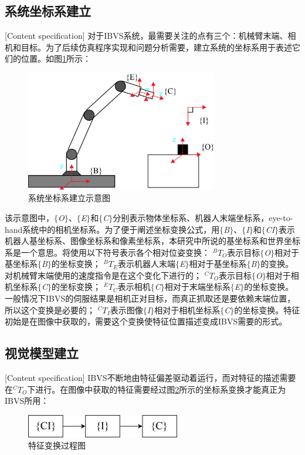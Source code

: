 \documentclass[fontset=fandol,type=bachelor,campus=harbin]{hithesisbook}
\begin{document}
\subsection{系统坐标系建立}[Content specification]
对于IBVS系统，最需要关注的点有三个：机械臂末端、相机和目标。为了后续仿真程序实现和问题分析需要，建立系统的坐标系用于表述它们的位置。如图\ref{系统坐标系建立}所示：
\begin{figure}[h]
\centering
\includegraphics[width = 0.75\textwidth]{chapter2/系统坐标系建立}
\caption{系统坐标系建立示意图}
\label{系统坐标系建立}
\end{figure}

该示意图中，$\lbrace$\textit{O}$\rbrace$、$\lbrace$\textit{E}$\rbrace$和$\lbrace$\textit{C}$\rbrace$分别表示物体坐标系、机器人末端坐标系，eye-to-hand系统中的相机坐标系。为了便于阐述坐标变换公式，用$\lbrace$\textit{B}$\rbrace$、$\lbrace$\textit{I}$\rbrace$和$\lbrace$\textit{CI}$\rbrace$表示机器人基坐标系、图像坐标系和像素坐标系，本研究中所说的基坐标系和世界坐标系是一个意思。将使用以下符号表示各个相对位姿变换：
$^{B}T_O$表示目标$\lbrace$\textit{O}$\rbrace$相对于基坐标系$\lbrace$\textit{B}$\rbrace$的坐标变换；
$^{B}T_E$表示机器人末端$\lbrace$\textit{E}$\rbrace$相对于基坐标系$\lbrace$\textit{B}$\rbrace$的变换。对机械臂末端使用的速度指令是在这个变化下进行的；
$^{C}T_O$表示目标$\lbrace$\textit{O}$\rbrace$相对于相机坐标系$\lbrace$\textit{C}$\rbrace$的坐标变换；
$^{E}T_C$表示相机$\lbrace$\textit{C}$\rbrace$相对于末端坐标系$\lbrace$\textit{E}$\rbrace$的坐标变换。一般情况下IBVS的伺服结果是相机正对目标，而真正抓取还是要依赖末端位置，所以这个变换是必要的；
$^{C}T_I$表示图像$\lbrace$\textit{I}$\rbrace$相对于相机坐标系$\lbrace$\textit{C}$\rbrace$的坐标变换。特征初始是在图像中获取的，需要这个变换使特征位置描述变成IBVS需要的形式\cite{zh1}。


\subsection{视觉模型建立}[Content specification]
IBVS不断地由特征偏差驱动着运行，而对特征的描述需要在$^{C}T_O$下进行。在图像中获取的特征需要经过图\ref{特征变换}所示的坐标系变换才能真正为IBVS所用：
\begin{figure}[h]
\centering
\includegraphics[width = 0.60\textwidth]{chapter2/特征变换}
\caption{特征变换过程图}
\label{特征变换}
\end{figure}
\end{document}
